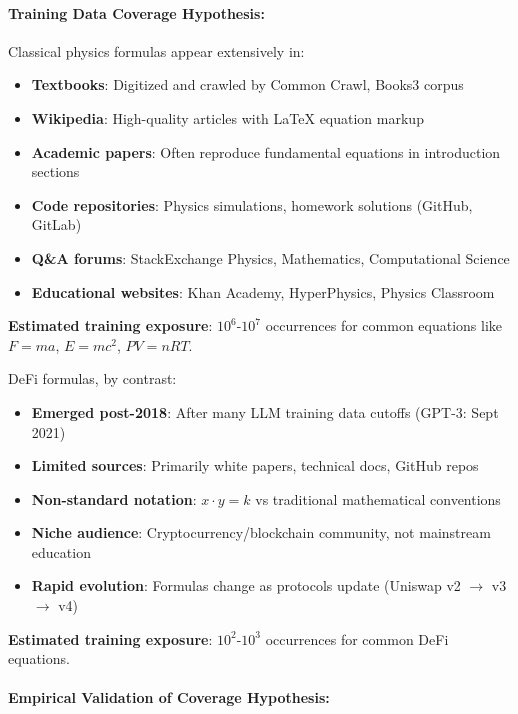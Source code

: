 \documentclass[twoside,11pt]{article}
\begin{document}
\paragraph{Training Data Coverage Hypothesis:}

Classical physics formulas appear extensively in:
\begin{itemize}
\item \textbf{Textbooks}: Digitized and crawled by Common Crawl, Books3 corpus
\item \textbf{Wikipedia}: High-quality articles with LaTeX equation markup
\item \textbf{Academic papers}: Often reproduce fundamental equations in introduction sections
\item \textbf{Code repositories}: Physics simulations, homework solutions (GitHub, GitLab)
\item \textbf{Q\&A forums}: StackExchange Physics, Mathematics, Computational Science
\item \textbf{Educational websites}: Khan Academy, HyperPhysics, Physics Classroom
\end{itemize}

\textbf{Estimated training exposure}: $10^6$-$10^7$ occurrences for common equations like $F = ma$, $E = mc^2$, $PV = nRT$.

DeFi formulas, by contrast:
\begin{itemize}
\item \textbf{Emerged post-2018}: After many LLM training data cutoffs (GPT-3: Sept 2021)\citep{kambhampati2024llms}
\item \textbf{Limited sources}: Primarily white papers, technical docs, GitHub repos
\item \textbf{Non-standard notation}: $x \cdot y = k$ vs traditional mathematical conventions
\item \textbf{Niche audience}: Cryptocurrency/blockchain community, not mainstream education
\item \textbf{Rapid evolution}: Formulas change as protocols update (Uniswap v2 $\to$ v3 $\to$ v4)
\end{itemize}

\textbf{Estimated training exposure}: $10^2$-$10^3$ occurrences for common DeFi equations.

\paragraph{Empirical Validation of Coverage Hypothesis:}
\end{document}
